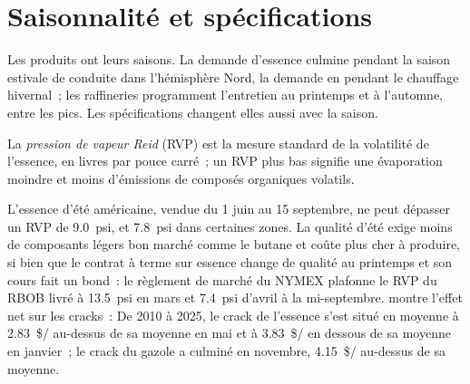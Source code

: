 \section{Saisonnalité et spécifications}

Les produits ont leurs saisons. La demande d'essence culmine pendant la saison estivale de conduite dans l'hémisphère Nord,
la demande en  pendant le chauffage hivernal~; les raffineries programment l'entretien au printemps et
à l'automne, entre les pics. Les spécifications changent elles aussi avec la saison.

\begin{definition}\label{def:m3:refined-products-and-cracks:rvp}
La \emph{pression de vapeur Reid} (RVP) est la mesure standard
de la volatilité de l'essence, en livres par pouce carré~; un RVP plus bas signifie une évaporation moindre
et moins d'émissions de composés organiques volatils.
\end{definition}

L'essence d'été américaine, vendue du 1 juin au 15 septembre, ne peut dépasser un RVP de
\qty{9.0}{psi}, et \qty{7.8}{psi} dans certaines zones. La qualité d'été exige moins de composants légers bon marché
comme le butane et coûte plus cher à produire, si bien que le contrat à terme sur essence
change de qualité au printemps et son cours fait un bond~: le règlement de marché du NYMEX plafonne le RVP du RBOB livré à \qty{13.5}{psi} en mars et
\qty{7.4}{psi} d'avril à la mi-septembre.
 montre l'effet net sur les cracks~:
De 2010 à 2025, le crack de l'essence s'est situé en moyenne à \qty{2.83}{\$/\barrel} au-dessus de sa moyenne en
mai et à \qty{3.83}{\$/\barrel} en dessous de sa moyenne en janvier~; le crack du gazole a culminé en
novembre, \qty{4.15}{\$/\barrel} au-dessus de sa moyenne.


